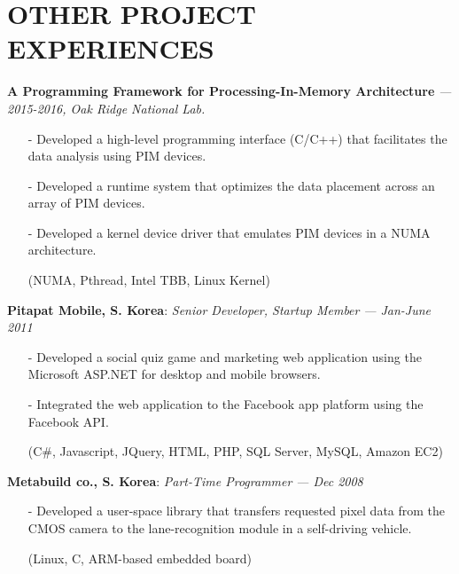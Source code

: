 \section{OTHER PROJECT EXPERIENCES} 
\vspace{0.03in}

  {\bf A Programming Framework for Processing-In-Memory Architecture}
   {\it \footnotesize --- 2015-2016, Oak Ridge National Lab.}
   \begin{itemize}[leftmargin=*]
    \setlength\itemsep{-0.02in}
    \item[-] Developed a high-level programming interface (C/C++) that
             facilitates the data analysis using PIM devices.
    \item[-] Developed a runtime system that optimizes the data placement across an array of
             PIM devices.
    \item[-] Developed a kernel device driver that emulates PIM devices in a NUMA architecture.
    \item[] {\small(NUMA, Pthread, Intel TBB, Linux Kernel)}
   \end{itemize}

  \vspace{-0.15in}
  {\bf Pitapat Mobile, S. Korea}: \emph{Senior Developer, Startup Member}
    {\it \footnotesize --- Jan-June 2011}
    \begin{itemize}[leftmargin=*]
    \setlength\itemsep{-0.02in}
     \item[-] Developed a social quiz game and marketing web application using 
              the Microsoft ASP.NET for desktop and mobile browsers.
     \item[-] Integrated the web application to the Facebook app platform using the Facebook API.
     \item[]  {\small(C\#, Javascript, JQuery, HTML, PHP, SQL Server, MySQL, Amazon EC2)}
\end{itemize}

  \vspace{-0.15in}
  {\bf Metabuild co., S. Korea}: \emph{Part-Time Programmer}
    {\it \footnotesize --- Dec 2008}
    \begin{itemize}[leftmargin=*]
    \setlength\itemsep{-0.02in}
     \item[-] Developed a user-space library that transfers requested pixel data
              from the CMOS camera
              to the lane-recognition module in a self-driving vehicle.
     \item[] {\small(Linux, C, ARM-based embedded board)}
\end{itemize}


